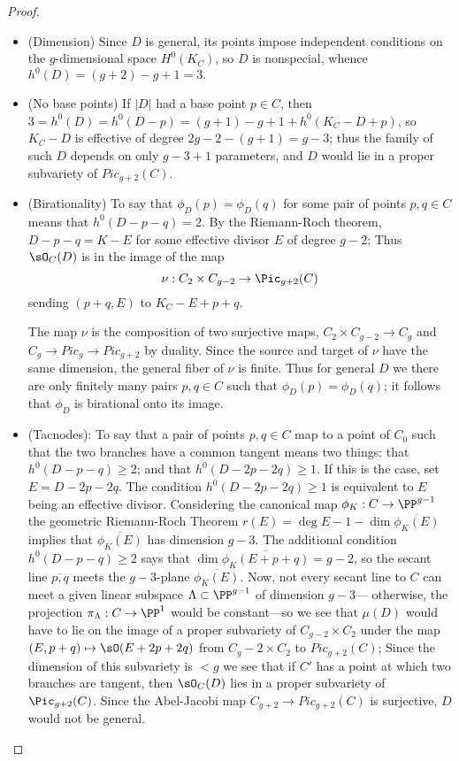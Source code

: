 \begin{proof}
\begin{itemize}
\item (Dimension) Since $D$ is general, its points impose independent conditions on the $g$-dimensional space $H^0(K_C)$,
so $D$ is nonspecial, whence $h^0(D) = (g+2)-g+1 = 3.$

\item (No base points) If $|D|$ had a base point $p\in C$, then $3=h^0(D) = h^0(D-p) = (g+1)-g+1+h^0(K_C-D+p)$,
so $K_C-D$ is effective of degree $2g-2-(g+1) =g-3$; thus the family of such $D$ depends on only $g-3+1$ parameters,
and $D$ would lie in a proper subvariety of $Pic_{g+2}(C).$

\item (Birationality)
 To say that $\phi_D(p) = \phi_D(q)$ for some pair of points $p, q \in C$   means that $h^0(D-p-q) = 2$. By the Riemann-Roch
 theorem, $D-p-q = K-E$ for some effective divisor $E$ of degree $g-2$; Thus $\sO_C(D)$ is in the image of the map
$$
\nu : C_2 \times C_{g-2} \to \Pic_{g+2}(C)
$$
sending $(p+q, E)$ to $K_C - E + p + q$. 

The map $\nu$ is 
the composition of two surjective maps, $C_2 \times C_{g-2} \to C_g$ and $C_g\to Pic_g \to Pic_{g+2}$ by duality. Since the source and target of $\nu$ have the same dimension, the general fiber of $\nu$ is finite. Thus for general $D$ we  there are only finitely many pairs $p, q \in C$ such that $\phi_D(p) = \phi_D(q)$; it follows that $\phi_D$ is birational onto its image.


\item (Tacnodes):  To say that a pair of points $p, q \in C$ map to a point of $C_0$ such that the 
two branches have a common tangent means two things: that $h^0(D-p-q) \geq 2$; and that $h^0(D-2p-2q) \geq 1$. If this is the case, set $E = D - 2p - 2q$.  The condition $h^0(D-2p-2q) \geq 1$ is equivalent to  $E$ being an effective divisor. Considering the canonical map $\phi_K: C\to \PP^{g-1}$ 
the geometric Riemann-Roch Theorem $r(E) = \deg E -1-\dim\overline{\phi_K(E)}$ implies that $\overline {\phi_K(E)}$ has dimension $g-3$. The additional condition $h^0(D-p-q) \geq 2$ says that $\dim\overline{\phi_K(E+p+q)} = g-2$,
so the secant line $\overline{p,q}$ meets the $g-3$-plane $\overline{\phi_K(E)}$. Now, not every secant line to $C$ can meet a given linear subspace $\Lambda \subset \PP^{g-1}$ of dimension $g-3$--- otherwise, the projection $\pi_\Lambda : C \to \PP^1$ would be constant---so we see that $\mu(D)$ would have to lie on the image of a proper subvariety of $C_{g-2} \times C_2$ under the map $(E, p+q) \mapsto \sO(E+2p+2q)$ from $C_g-2 \times C_2$ to $Pic_{g+2}(C)$;
Since the dimension of this subvariety is $<g$ we see that if $C'$ has
a point at which two branches are tangent, then $\sO_C(D)$ lies in a proper subvariety of $\Pic_{g+2}(C)$. Since
the Abel-Jacobi map $C_{g+2} \to Pic_{g+2}(C)$ is surjective,
 $D$ would not be general. 
 


\end{itemize}
\end{proof}
